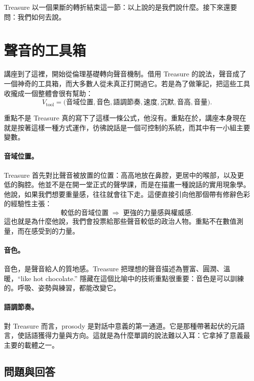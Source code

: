 Treasure 以一個果斷的轉折結束這一節：以上說的是我們說什麼。接下來還要問：我們如何去說。

\section{聲音的工具箱}

講座到了這裡，開始從倫理基礎轉向聲音機制。借用 Treasure 的說法，聲音成了一個神奇的工具箱，而大多數人從未真正打開過它。若是為了做筆記，把這些工具收攏成一個整體會很有幫助：
\begin{equation}
V_{\text{tool}}=
\bigl(
\text{音域位置},
\text{音色},
\text{語調節奏},
\text{速度},
\text{沉默},
\text{音高},
\text{音量}
\bigr).
\end{equation}

重點不是 Treasure 真的寫下了這樣一條公式，他沒有。重點在於，講座本身現在就是按著這樣一種方式運作，彷彿說話是一個可控制的系統，而其中有一小組主要變數。

\paragraph{音域位置。} Treasure 首先對比聲音被放置的位置：高高地放在鼻腔，更居中的喉部，以及更低的胸腔。他並不是在開一堂正式的聲學課，而是在描畫一種說話的實用現象學。他說，如果我們想要重量感，往往就會往下走。這便直接引向他那個帶有修辭色彩的經驗性主張：
\begin{equation}
\text{較低的音域位置} \;\Rightarrow\; \text{更強的力量感與權威感}.
\end{equation}
這也就是為什麼他說，我們會投票給那些聲音較低的政治人物。重點不在數值測量，而在感受到的力量。

\paragraph{音色。} 音色，是聲音給人的質地感。Treasure 把理想的聲音描述為豐富、圓潤、溫暖，``like hot chocolate.'' 隱藏在這個比喻中的技術重點很重要：音色是可以訓練的。呼吸、姿勢與練習，都能改變它。

\paragraph{語調節奏。} 對 Treasure 而言，prosody 是對話中意義的第一通道。它是那種帶著起伏的元語言，使話語獲得力量與方向。這就是為什麼單調的說法難以入耳：它拿掉了意義最主要的載體之一。

\subsection{問題與回答}

